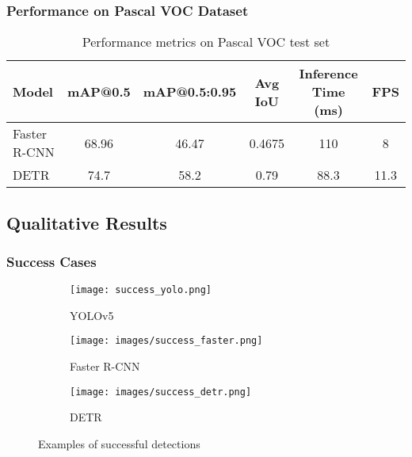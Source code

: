 \documentclass[12pt,a4paper]{article}
\begin{document}
\subsubsection{Performance on Pascal VOC Dataset}

\begin{table}[H]
    \centering
    \caption{Performance metrics on Pascal VOC test set}
    \label{tab:voc_results}
    \begin{tabular}{lccccc}
        \toprule
        \textbf{Model} & \textbf{mAP@0.5} & \textbf{mAP@0.5:0.95} & \textbf{Avg IoU} & \textbf{Inference Time (ms)} & \textbf{FPS} \\
        \midrule
        Faster R-CNN & 68.96 &  46.47 & 0.4675 & 110 & 8 \\
        DETR & 74.7 & 58.2 & 0.79 & 88.3 & 11.3 \\
        \bottomrule
    \end{tabular}
\end{table}



\subsection{Qualitative Results}
\subsubsection{Success Cases}

\begin{figure}[H]
    \centering
    \begin{subfigure}[b]{0.3\textwidth}
        \texttt{[image: success\_yolo.png]}
        \caption{YOLOv5}
    \end{subfigure}
    \hfill
    \begin{subfigure}[b]{0.3\textwidth}
        \texttt{[image: images/success\_faster.png]}
        \caption{Faster R-CNN}
    \end{subfigure}
    \hfill
    \begin{subfigure}[b]{0.3\textwidth}
        \texttt{[image: images/success\_detr.png]}
        \caption{DETR}
    \end{subfigure}
    \caption{Examples of successful detections}
    \label{fig:success_cases}
\end{figure}
\end{document}
